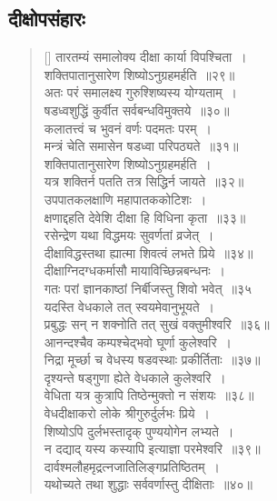\documentclass[twoside,12pt,notitlepage]{book}
\begin{document}
\subsection{दीक्षोपसंहारः}
\begin{verse}[\versewidth]
तारतम्यं समालोक्य दीक्षा कार्या विपश्चिता~।\\[-6pt]
शक्तिपातानुसारेण शिष्योऽनुग्रहमर्हति~॥२९॥\\
अतः परं समालक्ष्य गुरुश्शिष्यस्य योग्यताम्~।\\[-6pt]
षडध्वशुद्धिं कुर्वीत सर्वबन्धविमुक्तये~॥३०॥\\
कलातत्त्वं च भुवनं वर्णः पदमतः परम्~।\\[-6pt]
मन्त्रं चेति समासेन षडध्वा परिपठ्यते~॥३१॥\\
शक्तिपातानुसारेण शिष्योऽनुग्रहमर्हति~।\\[-6pt]
यत्र शक्तिर्न पतति तत्र सिद्धिर्न जायते~॥३२॥\\
उपपातकलक्षाणि महापातककोटिशः~।\\[-6pt]
क्षणाद्दहति देवेशि दीक्षा हि विधिना कृता~॥३३॥\\
रसेन्द्रेण यथा विद्धमयः सुवर्णतां व्रजेत्~।\\[-6pt]
दीक्षाविद्धस्तथा ह्यात्मा शिवत्वं लभते प्रिये~॥३४॥\\
दीक्षाग्निदग्धकर्मासौ मायाविच्छिन्नबन्धनः~।\\[-6pt]
गतः परां ज्ञानकाष्ठां निर्बीजस्तु शिवो भवेत्~॥३५\\
यदस्ति वेधकाले तत् स्वयमेवानुभूयते~।\\[-6pt]
प्रबुद्धः सन् न शक्नोति तत् सुखं वक्तुमीश्वरि~॥३६॥\\
आनन्दश्चैव कम्पश्चेद्भवो घूर्णा कुलेश्वरि~।\\[-6pt]
निद्रा मूर्च्छा च वेधस्य षडवस्थाः प्रकीर्तिताः~॥३७॥\\
दृश्यन्ते षड्गुणा ह्येते वेधकाले कुलेश्वरि~।\\[-6pt]
वेधिता यत्र कुत्रापि तिष्ठेन्मुक्तो न संशयः~॥३८॥\\
वेधदीक्षाकरो लोके श्रीगुरुर्दुर्लभः प्रिये~।\\[-6pt]
शिष्योऽपि दुर्लभस्तादृक् पुण्ययोगेन लभ्यते~।\\[-6pt]
न दद्याद् यस्य कस्यापि इत्याज्ञा परमेश्वरि~॥३९॥\\
दार्वश्मलौहमृद्रत्नजातिलिङ्गप्रतिष्ठितम्~।\\[-6pt]
यथोच्यते तथा शुद्धाः सर्ववर्णास्तु दीक्षिताः~॥४०॥\\

\end{verse}
\end{document}
